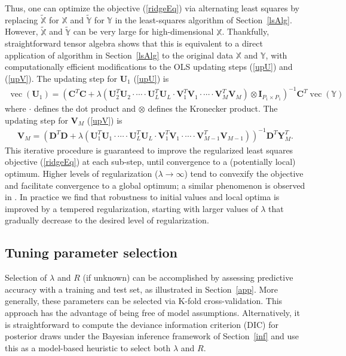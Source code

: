 \documentclass[12pt]{article}
\def\Y{\mathbf{Y}}
\def\U{\mathbf{U}}
\def\XX{\mathbb{X}}
\def\YY{\mathbb{Y}}
\def\V{\mathbf{V}}
\def\C{\mathbf{C}}
\def\D{\mathbf{D}}
\DeclareMathOperator*{\vect}{vec}
\begin{document}
Thus, one can optimize the objective (\ref{ridgeEq}) via alternating least squares by replacing $\tilde{\XX}$ for $\XX$  and $\tilde{\YY}$ for $\YY$ in the least-squares algorithm of Section~\ref{lsAlg}.  However, $\tilde{\XX}$  and $\tilde{\YY}$ can be very large for high-dimensional $\XX$. Thankfully, straightforward tensor algebra shows that this is equivalent to a direct application of algorithm in Section~\ref{lsAlg} to the original data $\XX$ and $\YY$, with computationally efficient modifications to the OLS updating steps (\ref{upU}) and (\ref{upV}).  The updating step for $\U_{1}$ (\ref{upU}) is 
\begin{align}
\vect(\U_1) = \left(\C^T\C + \lambda (\U_2^T \U_2 \cdot \cdots \cdot \U_L^T \U_L \cdot \V_1^T \V_1 \cdot \cdots \cdot  \V_M^T \V_M) \otimes \mathbf{I}_{P_1 \times P_1}    \right)^{-1}\C^T \vect(\YY) \label{upU2}	
\end{align}
where $\cdot$ defines the dot product and $\otimes$ defines the Kronecker product.  The updating step for $\V_{M}$ (\ref{upV}) is 
\begin{align}
\V_M = (\D^T \D + \lambda (\U_1^T\U_1 \cdot \cdots \cdot \U_L^T\U_L \cdot \V_1^T \V_1 \cdot \cdots \cdot \V_{M-1}^T \V_{M-1}))^{-1} \D^T \Y_M^T.	\label{upV2}
\end{align}
 This iterative procedure is guaranteed to improve the regularized least squares objective (\ref{ridgeEq}) at each sub-step,  until convergence to a (potentially local) optimum.  Higher levels of regularization ($\lambda \rightarrow \infty$) tend to convexify the objective and facilitate convergence to a global optimum; a similar phenomenon is observed in \citet{zhou2013tensor}.  In practice we find that robustness to initial values and local optima is improved by a tempered regularization, starting with larger values of $\lambda$ that gradually decrease to the desired level of regularization.  

\subsection{Tuning parameter selection}
\label{paramSelect}

Selection of $\lambda$ and $R$ (if unknown) can be accomplished by assessing predictive accuracy with a training and test set, as illustrated in Section~\ref{app}. More generally, these parameters can be selected via K-fold cross-validation. This approach has the advantage of being free of model assumptions.    Alternatively, it is straightforward to compute the deviance information criterion (DIC) \citep{spiegelhalter2014deviance} for posterior draws under the Bayesian inference framework of Section~\ref{inf} and use this as a model-based heuristic to select both $\lambda$ and $R$.              
\end{document}
